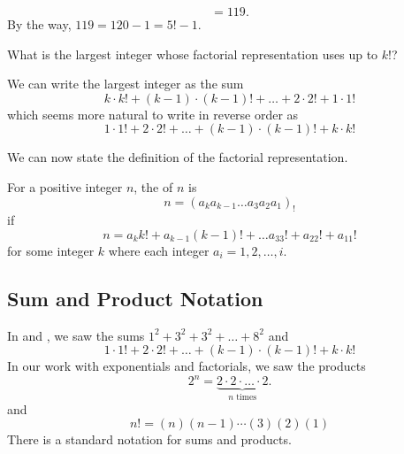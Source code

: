 \begin{exam}
\begin{apart}
\begin{soln}
$$                        =119.$$
                    By the way, $119 = 120-1 = 5!-1$.
                \end{soln}
            \item What is the largest integer whose factorial representation uses up to $k!$?
                \begin{soln}
                    We can write the largest integer as the sum
                        $$k\cdot k!
                        + (k-1) \cdot (k-1)!
                        + \ldots
                        + 2 \cdot 2!
                        + 1 \cdot 1!$$
                    which seems more natural to write in reverse order as 
                        $$ 1 \cdot 1! + 2 \cdot 2! + \ldots + (k-1) \cdot (k-1)! +k \cdot k!$$
                \end{soln}
        \end{apart}
\end{exam}

We can now state the definition of the factorial representation.

\begin{defn}
\label{defn_fact_rep}
    For a positive integer $n$, the  of $n$ is 
        $$n= (a_ka_{k-1}\dots a_3a_2a_1)_!$$
    if 
        $$n = a_kk!+a_{k-1}(k-1)! + \ldots a_33! + a_22! + a_11!$$
    for some integer $k$ where each integer $a_i=1, 2, \ldots, i$.
\end{defn}

\newcommand{\subsigmapi}{Sum and Product Notation}
\subsection{\subsigmapi}
\label{sub_sigma_pi}

In  and , we saw the sums 
    $1^2+3^2+3^2+ \ldots + 8^2$
and
    $$ 1 \cdot 1! + 2 \cdot 2! + \ldots + (k-1) \cdot (k-1)! +k \cdot k!$$
In our work with exponentials and factorials, we saw the products
    $$2^n = \underbrace{2 \cdot 2 \cdot \ldots \cdot 2}_{n \text{ times}}.$$ 
and 
    $$n! = (n)(n-1)\cdots(3)(2)(1)$$
There is a standard notation for sums and products.

